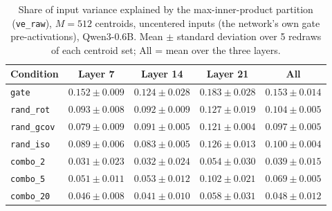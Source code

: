 \begin{table}[t]
\centering
\begin{tabular}{lcccc}
\toprule
Condition & Layer 7 & Layer 14 & Layer 21 & All \\
\midrule
\texttt{gate} & $0.152 \pm 0.009$ & $0.124 \pm 0.028$ & $0.183 \pm 0.028$ & $0.153 \pm 0.014$ \\
\addlinespace
\texttt{rand\_rot} & $0.093 \pm 0.008$ & $0.092 \pm 0.009$ & $0.127 \pm 0.019$ & $0.104 \pm 0.005$ \\
\texttt{rand\_gcov} & $0.079 \pm 0.009$ & $0.091 \pm 0.005$ & $0.121 \pm 0.004$ & $0.097 \pm 0.005$ \\
\texttt{rand\_iso} & $0.089 \pm 0.006$ & $0.083 \pm 0.005$ & $0.126 \pm 0.013$ & $0.100 \pm 0.004$ \\
\addlinespace
\texttt{combo\_2} & $0.031 \pm 0.023$ & $0.032 \pm 0.024$ & $0.054 \pm 0.030$ & $0.039 \pm 0.015$ \\
\texttt{combo\_5} & $0.051 \pm 0.011$ & $0.053 \pm 0.012$ & $0.102 \pm 0.021$ & $0.069 \pm 0.005$ \\
\texttt{combo\_20} & $0.046 \pm 0.008$ & $0.041 \pm 0.010$ & $0.058 \pm 0.031$ & $0.048 \pm 0.012$ \\
\bottomrule
\end{tabular}
\caption{Share of input variance explained by the max-inner-product partition (\texttt{ve\_raw}), $M = 512$ centroids, uncentered inputs (the network's own gate pre-activations), Qwen3-0.6B. Mean $\pm$ standard deviation over 5 redraws of each centroid set; All = mean over the three layers.}
\label{tab:ve-raw-ip-raw-M512}
\end{table}

